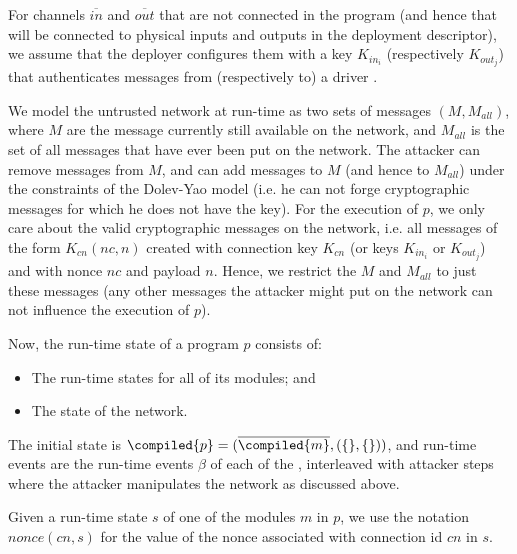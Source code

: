 For channels $\overline{in}$ and $\overline{out}$ that are not connected in the program (and hence that will be connected to physical inputs and outputs in the deployment descriptor), we assume that the
deployer configures them with a key $K_{in_i}$ (respectively $K_{out_j}$)
that authenticates messages from (respectively to) a driver
\protmod{}.

We model the untrusted network at run-time as two sets of messages $(M,M_{all})$, where $M$ are the message currently still available on the network, and $M_{all}$ is the set of
all messages that have ever been put on the network. The attacker can remove messages from $M$, and can add messages to $M$ (and hence to $M_{all}$) under the
constraints of the Dolev-Yao model (i.e. he can not forge cryptographic messages for which he does not have the key).
For the execution of $p$, we only care about the valid cryptographic messages on the network, i.e. all messages of the form $K_{cn}(nc,n)$  created with connection key $K_{cn}$  (or keys $K_{in_i}$ or $K_{out_j}$)
and with nonce $nc$ and payload $n$. Hence, we restrict the $M$ and $M_{all}$ to just these messages (any other messages the attacker might put on the network can not
influence the execution of $p$).

Now, the run-time state of a program $p$ consists of:

\begin{itemize}
  \item The run-time states for all of its modules; and
  \item The state of the network.
\end{itemize}

The initial state is $\compiled{p} =
(\overline{\compiled{m}},(\{\},\{\}))$, and run-time events are the
run-time events $\beta$ of each of the \protmods{}, interleaved with attacker
steps where the attacker manipulates the network as discussed above.

Given a run-time state $s$ of one of the modules $m$ in $p$, we use the notation $nonce(cn,s)$ for the value of the nonce associated with connection id $cn$ in $s$.

